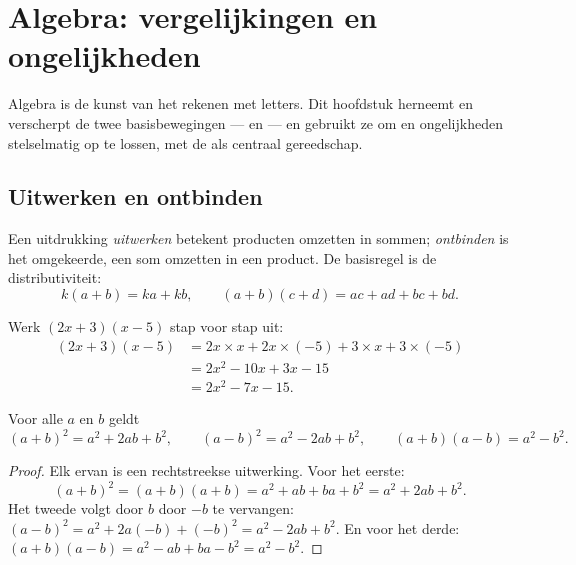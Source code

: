 \chapter{Algebra: vergelijkingen en ongelijkheden}\label{ch:g10:algebra}

Algebra is de kunst van het rekenen met letters. Dit hoofdstuk herneemt en
verscherpt de twee basisbewegingen ---  en  --- en gebruikt
ze om  en ongelijkheden stelselmatig op te lossen, met de
 als centraal gereedschap.

\section{Uitwerken en ontbinden}

\begin{definition}\label{def:g10:algebra:expand}
Een uitdrukking \emph{uitwerken} betekent producten omzetten
in sommen; \emph{ontbinden} is het omgekeerde,
een som omzetten in een product. De basisregel is de distributiviteit:
\[
k(a + b) = ka + kb,
\qquad
(a + b)(c + d) = ac + ad + bc + bd .
\]
\end{definition}

\begin{example}\label{ex:g10:algebra:expand}
Werk $(2x + 3)(x - 5)$ stap voor stap uit:
\begin{align*}
(2x + 3)(x - 5)
&= 2x \times x + 2x \times (-5) + 3 \times x + 3 \times (-5) \\
&= 2x^2 - 10x + 3x - 15 \\
&= 2x^2 - 7x - 15 .
\end{align*}
\end{example}

\begin{theorem}\label{thm:g10:algebra:identities}
Voor alle  $a$ en $b$ geldt
\[
(a+b)^2 = a^2 + 2ab + b^2,
\qquad
(a-b)^2 = a^2 - 2ab + b^2,
\qquad
(a+b)(a-b) = a^2 - b^2 .
\]
\end{theorem}

\begin{proof}
Elk ervan is een rechtstreekse uitwerking. Voor het eerste:
\[
(a+b)^2 = (a+b)(a+b) = a^2 + ab + ba + b^2 = a^2 + 2ab + b^2 .
\]
Het tweede volgt door $b$ door $-b$ te vervangen:
$(a-b)^2 = a^2 + 2a(-b) + (-b)^2 = a^2 - 2ab + b^2$. En voor het derde:
$(a+b)(a-b) = a^2 - ab + ba - b^2 = a^2 - b^2$.
\end{proof}

